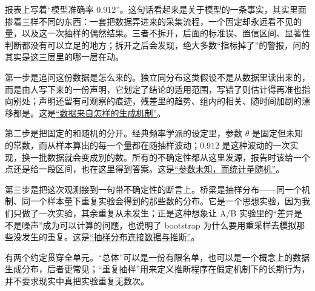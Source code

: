 报表上写着``模型准确率 \(0.912\)''。这句话看起来是关于模型的一条事实，其实里面掺着三样不同的东西：一套把数据弄进来的采集流程，一个固定却永远看不见的量，以及这一次抽样的偶然结果。三者不拆开，后面的标准误、置信区间、显著性判断都没有可以立足的地方；拆开之后会发现，绝大多数``指标掉了''的警报，问的其实是这三层里的哪一层在动。

第一步是追问这份数据是怎么来的。独立同分布这类假设不是从数据里读出来的，而是由人写下来的一份声明，它划定了结论的适用范围，写错了则估计得再准也指向别处；声明还留有可观察的痕迹，残差里的趋势、组内的相关、随时间加剧的漂移都是。这是\hyperref[sec:11-Mathematical-Statistics/01-Statistical-Models/01]{``数据来自怎样的生成机制''}。

第二步是把固定的和随机的分开。经典频率学派的设定里，参数 \(\theta\) 是固定但未知的常数，而从样本算出的每一个量都在随抽样波动；\(0.912\) 是这种波动的一次实现，换一批数据就会变成别的数。所有的不确定性都从这里发源，报告时该给一个点还是给一段区间，也在这里得到答案。这是\hyperref[sec:11-Mathematical-Statistics/01-Statistical-Models/02]{``参数未知，而统计量随机''}。

第三步是把这次观测接到一句带不确定性的断言上。桥梁是抽样分布——同一个机制、同一个样本量下重复实验会得到的那些数的分布。它是一个思想实验，因为我们只做了一次实验，其余重复从未发生；正是这种想象让 A/B 实验里的``差异是不是噪声''成为可以计算的问题，也说明了 bootstrap 为什么要用重采样去模拟那些没发生的重复。这是\hyperref[sec:11-Mathematical-Statistics/01-Statistical-Models/03]{``抽样分布连接数据与推断''}。

有两个约定贯穿全单元。``总体''可以是一份有限名单，也可以是一个概念上的数据生成分布，后者更常见；``重复抽样''用来定义推断程序在假定机制下的长期行为，并不要求现实中真把实验重复无数次。

